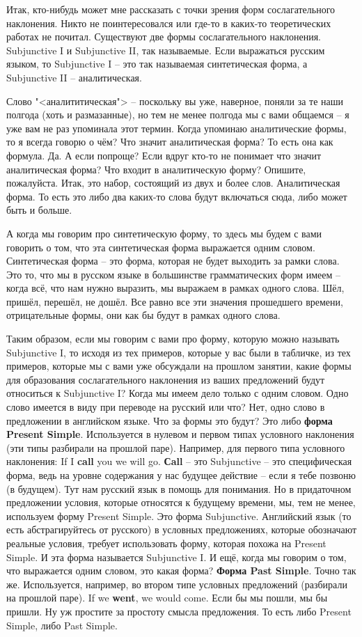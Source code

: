 \documentclass[main.tex]{subfiles}
\begin{document}
Итак, кто-нибудь может мне рассказать с точки зрения форм сослагательного наклонения.
Никто не поинтересовался или где-то в каких-то теоретических работах не почитал.
Существуют две формы сослагательного наклонения.
Subjunctive I и Subjunctive II, так называемые.
Если выражаться русским языком, то Subjunctive I -- это так называемая синтетическая форма, а Subjunctive II -- аналитическая.

Слово "<аналититическая"> -- поскольку вы уже, наверное, поняли за те наши полгода (хоть и размазанные), но тем не менее полгода мы с вами общаемся -- я уже вам не раз упоминала этот термин.
Когда упоминаю аналитические формы, то я всегда говорю о чём?
Что значит аналитическая форма?
То есть она как формула.
Да.
А если попроще?
Если вдруг кто-то не понимает что значит аналитическая форма?
Что входит в аналитическую форму?
Опишите, пожалуйста.
Итак, это набор, состоящий из двух и более слов.
Аналитическая форма.
То есть это либо два каких-то слова будут включаться сюда, либо может быть и больше.

А когда мы говорим про синтетическую форму, то здесь мы будем с вами говорить о том, что эта синтетическая форма выражается одним словом.
Синтетическая форма -- это форма, которая не будет выходить за рамки слова.
Это то, что мы в русском языке в большинстве грамматических форм имеем -- когда всё, что нам нужно выразить, мы выражаем в рамках одного слова.
Шёл, пришёл, перешёл, не дошёл.
Все равно все эти значения прошедшего времени, отрицательные формы, они как бы будут в рамках одного слова.

Таким образом, если мы говорим с вами про форму, которую можно называть Subjunctive I, то исходя из тех примеров, которые у вас были в табличке, из тех примеров, которые мы с вами уже обсуждали на прошлом занятии, какие формы для образования сослагательного наклонения из ваших предложений будут относиться к Subjunctive I?
Когда мы имеем дело только с одним словом.
Одно слово имеется в виду при переводе на русский или что?
Нет, одно слово в предложении в английском языке.
Что за формы это будут?
Это либо \textbf{форма Present Simple}.
Используется в нулевом и первом типах условного наклонения (эти типы разбирали на прошлой паре).
Например, для первого типа условного наклонения:
If I \textbf{call} you we will go.
\textbf{Сall} -- это Subjunctive -- это специфическая форма, ведь на уровне содержания у нас будущее действие -- если я тебе позвоню (в будущем).
Тут нам русский язык в помощь для понимания.
Но в придаточном предложении условия, которые относятся к будущему времени, мы, тем не менее, используем форму Present Simple.
Это форма Subjunctive.
Английский язык (то есть абстрагируйтесь от русского) в условных предложениях, которые обозначают реальные условия, требует использовать форму, которая похожа на Present Simple.
И эта форма называется Subjunctive I.
И ещё, когда мы говорим о том, что выражается одним словом, это какая форма?
\textbf{Форма Past Simple}.
Точно так же.
Используется, например, во втором типе условных предложений (разбирали на прошлой паре).
If we \textbf{went}, we would come.
Если бы мы пошли, мы бы пришли.
Ну уж простите за простоту смысла предложения.
То есть либо Present Simple, либо Past Simple.
\end{document}
